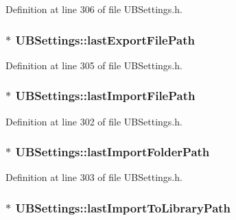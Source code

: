 Definition at line 306 of file U\-B\-Settings.\-h.

\hypertarget{class_u_b_settings_ac09981b17cde076f6c2b902b63dfe2cd}{
\subsubsection[{last\-Export\-File\-Path}]{$\ast$ U\-B\-Settings\-::last\-Export\-File\-Path}}\label{db/d66/class_u_b_settings_ac09981b17cde076f6c2b902b63dfe2cd}


Definition at line 305 of file U\-B\-Settings.\-h.

\hypertarget{class_u_b_settings_acd595117bf50e916afa5e0639d656227}{
\subsubsection[{last\-Import\-File\-Path}]{$\ast$ U\-B\-Settings\-::last\-Import\-File\-Path}}\label{db/d66/class_u_b_settings_acd595117bf50e916afa5e0639d656227}


Definition at line 302 of file U\-B\-Settings.\-h.

\hypertarget{class_u_b_settings_a9d57a5cf038caefb6a2ed1f169b19ae6}{
\subsubsection[{last\-Import\-Folder\-Path}]{$\ast$ U\-B\-Settings\-::last\-Import\-Folder\-Path}}\label{db/d66/class_u_b_settings_a9d57a5cf038caefb6a2ed1f169b19ae6}


Definition at line 303 of file U\-B\-Settings.\-h.

\hypertarget{class_u_b_settings_a8f07c9c5f1acc312c384f91da004eda7}{
\subsubsection[{last\-Import\-To\-Library\-Path}]{$\ast$ U\-B\-Settings\-::last\-Import\-To\-Library\-Path}}\label{db/d66/class_u_b_settings_a8f07c9c5f1acc312c384f91da004eda7}



